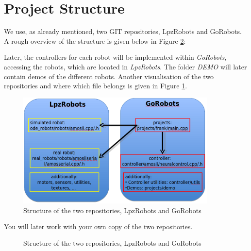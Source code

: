 \section{Project Structure}

We use, as already mentioned, two GIT repositories, LpzRobots and GoRobots. A rough overview of the structure is given below in Figure \ref{struc}:


Later, the controllers for each robot will be implemented within \emph{GoRobots}, accessing the robots, which are located in \emph{LpzRobots}. The folder \emph{DEMO} will later contain demos of the different robots.
Another visualisation of the two repositories and where which file belongs is given in Figure \ref{struc2}. 
\begin{figure}[h!]
 \begin{center}
  \includegraphics[width=10cm]{./Pics/struct.png}
 \end{center}
\caption{Structure of the two repositories, LpzRobots and GoRobots}
\label{struc2}
\end{figure}

You will later work with your own copy of the two repositories.

\newpage

\begin{figure}[h!]
 \begin{center}
  
 \end{center}
\caption{Structure of the two repositories, LpzRobots and GoRobots}
\label{struc}
\end{figure}